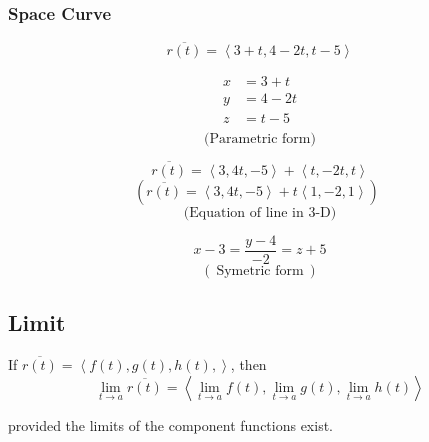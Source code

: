 \subsubsection{Space Curve}%
\label{ssub:space_curve}


\[\overline{r(t)} = \left<3+t, 4-2t, t-5 \right>\]

\begin{align*}
	x &=  3 + t \\
	y &=  4 - 2t \\
	z &=  t-5 \\
\end{align*}
\[\:\text{(Parametric form)}\:\]

\[\overline{r(t)} = \left<3, 4t, -5 \right> + \left<t, -2t, t \right>\]
\[\left(   \overline{r(t)} = \left<3, 4t, -5 \right> + t\left<1, -2, 1 \right>\right)\:\text{}\:\]
\[\:\text{(Equation of line in 3-D)}\:\]

\[x-3 =\frac{y-4}{-2} = z+5\]
\[\left( \:\text{Symetric form}\: \right) \]

\subsection{Limit}%
\label{sub:limit}

\begin{definition}
	If $\overline{r(t)} = \left<f(t), g(t), h(t), \right>$, then
	\[\lim_{t \to a} \overline{r(t)} = \left<\lim_{t \to a} f(t), \lim_{t \to a}g(t), \lim_{t \to a}h(t) \right> \]

	provided the limits of the component functions exist.
\end{definition}


